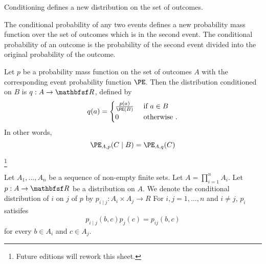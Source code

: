 

Conditioning defines a new distribution on the set of outcomes.


The conditional probability
of any two events
defines a new probability
mass function over the
set of outcomes
which is in the second
event.
The conditional probability
of an outcome
is the probability of the
second event
divided into the original probability
of the outcome.


Let $p$ be a probability
mass function on the set of
outcomes $A$ with the corresponding
event probability function $\PE$.
Then the distribution conditioned on $B$ is $q: A \to \R$, defined by
\[
  q(a) = \begin{cases}
    \frac{p(a)}{\PE(B)} & \text{ if } a \in B \\
    0 & \text{ otherwise }.
  \end{cases}
\]
In other words,
\[
   \PE_{A, p}(C \mid B) = \PE_{A,q}(C)
\]

\footnote{Future editions will rework this sheet.}

Let $A_1, \dots, A_n$ be a sequence of non-empty finite sets.
Let $A = \prod_{i = 1}^{n} A_i$.
Let $p: A \to \R$ be a distribution on $A$.
We denote the conditional distribution of $i$ on $j$ of $p$ by $p_{i \mid j}: A_i \times A_j \to R$
For $i,j = 1, \dots, n$ and $i \neq j$, $p_i$ satisifes
\[
  p_{i \mid j}(b, c)p_{j}(c) = p_{ij}(b, c)
\]
for every $b \in A_i$ and $c \in A_j$.
